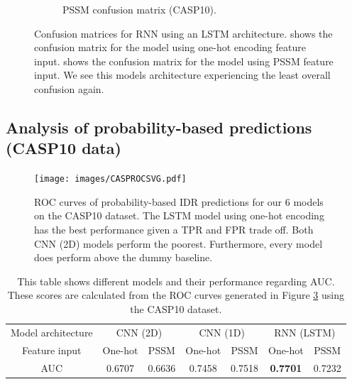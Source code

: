 \documentclass{l4proj}
\begin{document}
\begin{figure}[!htb]
\begin{subfigure}[b]{0.48\textwidth}
        \caption{PSSM confusion matrix (CASP10).}
        \label{fig:caspcfrnnpssm}
    \end{subfigure}
    \caption{Confusion matrices for RNN using an LSTM architecture.  shows the confusion matrix for the model using one-hot encoding feature input.  shows the confusion matrix for the model using PSSM feature input. We see this models architecture experiencing the least overall confusion again.}
    \label{fig:caspcfrnn}
\end{figure}

\subsection{Analysis of probability-based predictions (CASP10 data)}

\begin{figure}[!htb]
    \centering
    \texttt{[image: images/CASPROCSVG.pdf]}    

    \caption{ROC curves of probability-based IDR predictions for our 6 models on the CASP10 dataset. The LSTM model using one-hot encoding has the best performance given a TPR and FPR trade off. Both CNN (2D) models perform the poorest. Furthermore, every model does perform above the dummy baseline.}

    \label{fig:roccasp} 
\end{figure}

\begin{table}[!htb]
    \centering
    \caption{This table shows different models and their performance regarding AUC. These scores are calculated from the ROC curves generated in Figure \ref{fig:roccasp} using the CASP10 dataset.}
    \begin{tabular}{@{}ccccccc@{}}
    \toprule
    Model architecture & \multicolumn{2}{c}{CNN (2D)} & \multicolumn{2}{c}{CNN (1D)} & \multicolumn{2}{c}{RNN (LSTM)} \\ \cmidrule{0-0}
    Feature input & One-hot & PSSM & One-hot & PSSM & One-hot & PSSM \\ \midrule
    AUC & 0.6707 & 0.6636 & 0.7458 & 0.7518 & \textbf{0.7701} & 0.7232 \\ \bottomrule
    \end{tabular}
    
    \label{tab:auccasp}
\end{table}
\end{document}
